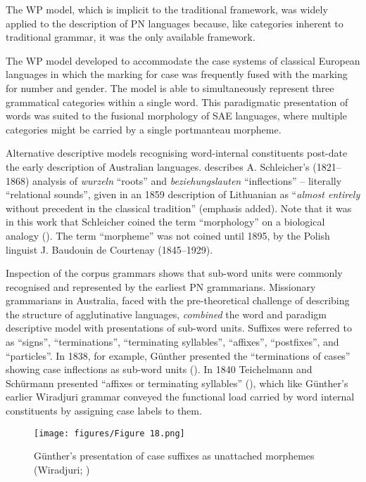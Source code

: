 The WP model, which is implicit to the traditional framework, was widely applied to the description of PN languages because, like categories inherent to traditional grammar, it was the only available framework.

The WP model developed to accommodate the case systems of classical European languages in which the marking for case was frequently fused with the marking for number and gender. The model is able to simultaneously represent three grammatical categories within a single word. This paradigmatic presentation of words was suited to the fusional morphology of SAE languages, where multiple categories might be carried by a single portmanteau morpheme.

Alternative descriptive models recognising word-internal constituents post-date the early description of Australian languages. \citet[383]{blevins_word-based_2013} describes A. Schleicher’s (1821--1868) analysis of \textit{wurzeln} “roots” and \textit{beziehungslauten} “inflec\-tions” – literally “relational sounds'', given in an 1859 description of Lithuanian as ``\textit{almost entirely} without precedent in the classical tradition'' (emphasis added). Note that it was in this work that Schleicher coined the term “morphology” on a biological analogy (\citeyear[35]{schleicher_zur_1859}). The term “morpheme” was not coined until 1895, by the Polish linguist J. Baudouin de Courtenay (1845--1929). 

Inspection of the corpus grammars shows that sub-word units were commonly recognised and represented by the earliest PN grammarians. Missionary grammarians in Australia, faced with the pre-theoretical challenge of describing the structure of agglutinative languages, \textit{combined} the word and paradigm descriptive model with presentations of sub-word units. Suffixes were referred to as “signs'', “terminations'', “terminating syllables'', “affixes'', “postfixes'', and “particles''. In 1838, for example, Günther presented the “terminations of cases” showing case inflections as sub-word units (). In 1840 Teichelmann and Schürmann presented “affixes or terminating syllables” (), which like Günther’s earlier Wiradjuri grammar conveyed the functional load carried by word internal constituents by assigning case labels to them.

\begin{figure}
\texttt{[image: figures/Figure 18.png]}
\caption{Günther’s presentation of case suffixes as unattached morphemes (Wiradjuri; \citealt[45]{gunther_native_1838})}
\label{fig:2:18}
\end{figure} 


